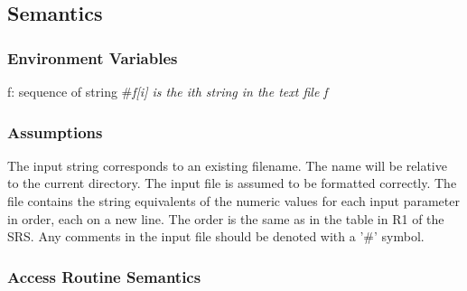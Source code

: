 \documentclass[12pt]{article}
\begin{document}
\subsection{Semantics}

\subsubsection{Environment Variables}

f: sequence of string \#\textit{f[i] is the ith string in the text file f}\\ 

\subsubsection{Assumptions}

The input string corresponds to an existing filename.  The name will be relative
to the current directory. The input file is assumed to be formatted
correctly. The file contains the string equivalents of the numeric values for
each input parameter in order, each on a new line. The order is the same as in
the table in R1 of the SRS. Any comments in the input file should be denoted
with a '\#' symbol.

\subsubsection{Access Routine Semantics}
\end{document}
